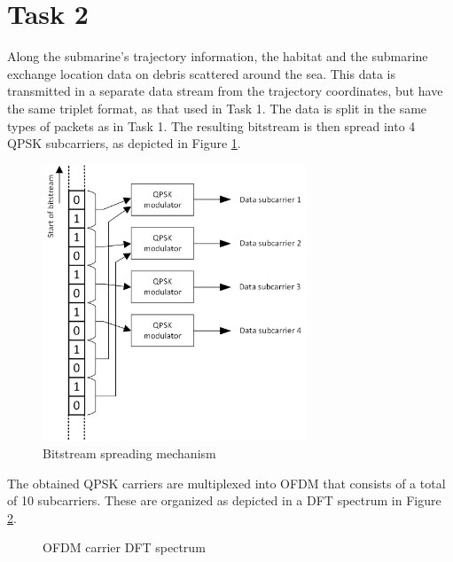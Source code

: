 \documentclass[a4paper]{article}
\begin{document}
\section{Task 2}

Along the submarine's trajectory information, the habitat and the submarine exchange location data on debris scattered around the sea. This data is transmitted in a separate data stream from the trajectory coordinates, but have the same triplet format, as that used in Task 1. The data is split in the same types of packets as in Task 1. The resulting bitstream is then spread into 4 QPSK subcarriers, as depicted in Figure \ref{fig:spread}.
\begin{figure}[h!]
	\centering
	\includegraphics[width=0.7\textwidth]{spread.png}
	\caption{Bitstream spreading mechanism}
	\label{fig:spread}
\end{figure}

The obtained QPSK carriers are multiplexed into OFDM that consists of a total of 10 subcarriers. These are organized as depicted in a DFT spectrum in Figure \ref{fig:dft}.
\begin{figure}[h!]
	\centering
	\caption{OFDM carrier DFT spectrum}
	\label{fig:dft}
\end{figure}
\end{document}
